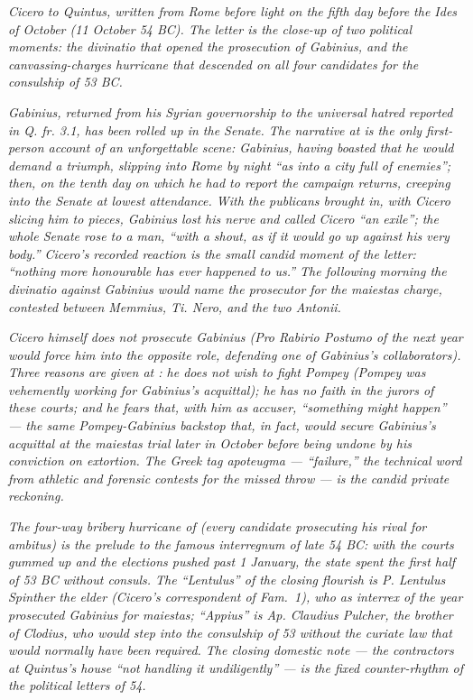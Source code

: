 
\textit{Cicero to Quintus, written from Rome before light on
the fifth day before the Ides of October (11 October 54 BC).
The letter is the close-up of two political moments: the
divinatio that opened the prosecution of Gabinius, and the
canvassing-charges hurricane that descended on all four
candidates for the consulship of 53 BC.}

\textit{Gabinius, returned from his Syrian governorship to
the universal hatred reported in \textit{Q. fr.} 3.1, has been
rolled up in the Senate. The narrative at  is
the only first-person account of an unforgettable scene:
Gabinius, having boasted that he would demand a triumph,
slipping into Rome by night ``as into a city full of
enemies''; then, on the tenth day on which he had to report
the campaign returns, creeping into the Senate at lowest
attendance. With the publicans brought in, with Cicero
slicing him to pieces, Gabinius lost his nerve and called
Cicero ``an exile''; the whole Senate rose to a man, ``with a
shout, as if it would go up against his very body.'' Cicero's
recorded reaction is the small candid moment of the letter:
``nothing more honourable has ever happened to us.'' The
following morning the divinatio against Gabinius would name
the prosecutor for the \textit{maiestas} charge, contested
between Memmius, Ti. Nero, and the two Antonii.}

\textit{Cicero himself does not prosecute Gabinius (\textit{Pro
Rabirio Postumo} of the next year would force him into the
opposite role, defending one of Gabinius's collaborators).
Three reasons are given at : he does not wish
to fight Pompey (Pompey was vehemently working for Gabinius's
acquittal); he has no faith in the jurors of these courts;
and he fears that, with him as accuser, ``something might
happen'' --- the same Pompey-Gabinius backstop that, in fact,
would secure Gabinius's acquittal at the \textit{maiestas}
trial later in October before being undone by his conviction
on extortion. The Greek tag \textit{apoteugma} ---
``failure,'' the technical word from athletic and forensic
contests for the missed throw --- is the candid private
reckoning.}

\textit{The four-way bribery hurricane of 
(every candidate prosecuting his rival for ambitus) is the
prelude to the famous interregnum of late 54 BC: with the
courts gummed up and the elections pushed past 1 January, the
state spent the first half of 53 BC without consuls. The
``Lentulus'' of the closing flourish is P. Lentulus Spinther
the elder (Cicero's correspondent of Fam.\ 1), who as
\textit{interrex} of the year prosecuted Gabinius for
\textit{maiestas}; ``Appius'' is Ap. Claudius Pulcher, the
brother of Clodius, who would step into the consulship of 53
without the curiate law that would normally have been required.
The closing domestic note --- the contractors at Quintus's
house ``not handling it undiligently'' --- is the fixed
counter-rhythm of the political letters of 54.}
